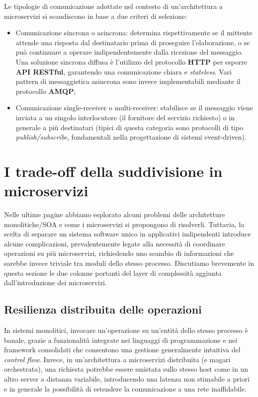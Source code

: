 Le tipologie di comunicazione adottate nel contesto di un'architettura a microservizi si scandiscono in base a due criteri di selezione\cite[19]{Thesis_microservices}:
\begin{itemize}
    \item Comunicazione sincrona o asincrona: determina rispettivamente se il mittente attende una risposta dal destinatario prima di proseguire l'elaborazione, o se può continuare a operare indipendentemente dalla ricezione del messaggio. Una soluzione sincrona diffusa è l'utilizzo del protocollo \textbf{HTTP} per esporre \textbf{API RESTful}, garantendo una comunicazione chiara e \emph{stateless}. Vari pattern di messaggistica asincrona sono invece implementabili mediante il protocollo \textbf{AMQP};
    \item Comunicazione single-receiver o multi-receiver: stabilisce se il messaggio viene inviata a un singolo interlocutore (il fornitore del servizio richiesto) o in generale a più destinatari (tipici di questa categoria sono protocolli di tipo \emph{publish/subscribe}, fondamentali nella progettazione di sistemi event-driven).
\end{itemize}

\section{I trade-off della suddivisione in microservizi}
Nelle ultime pagine abbiamo esplorato alcuni problemi delle architetture monolitiche/SOA e come i microservizi si propongono di risolverli. Tuttavia, la scelta di separare un sistema software unico in applicativi indipendenti introduce alcune complicazioni, prevalentemente legate alla necessità di coordinare operazioni su più microservizi, richiedendo uno scambio di informazioni che sarebbe invece triviale tra moduli dello stesso processo.
Discutiamo brevemente in questa sezione le due colonne portanti del layer di complessità aggiunta dall'introduzione dei microservizi.

\subsection{Resilienza distribuita delle operazioni}
In sistemi monolitici, invocare un'operazione su un'entità dello stesso processo è banale, grazie a funzionalità integrate nei linguaggi di programmazione e nei framework consolidati che consentono una gestione generalmente intuitiva del \emph{control flow}.
Invece, in un'architettura a microservizi distribuita (e magari orchestrata), una richiesta potrebbe essere smistata sullo stesso host come in un altro server a distanza variabile, introducendo una latenza non stimabile a priori e in generale la possibilità di estendere la comunicazione a una rete inaffidabile.

